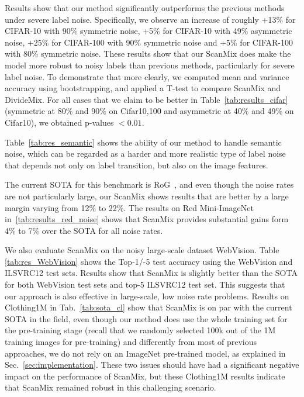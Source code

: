\documentclass[review]{elsarticle}
\theoremstyle{plain}
\begin{document}
Results show that our method significantly outperforms the previous methods under severe label noise. Specifically, we observe an increase of roughly +13\% for CIFAR-10 with 90\% symmetric noise, +5\% for CIFAR-10 with 49\% asymmetric noise, +25\% for CIFAR-100 with 90\% symmetric noise and +5\% for CIFAR-100 with 80\% symmetric noise. These results show that our ScanMix does make the model more robust to noisy labels than previous methods, particularly for severe label noise. To demonstrate that more clearly, we computed mean and variance accuracy using bootstrapping, and applied a T-test to compare ScanMix and DivideMix. For all cases that we claim to be better in Table~\ref{tab:results_cifar} (symmetric at 80\% and 90\% on Cifar10,100 and asymmetric at 40\% and 49\% on Cifar10), we obtained p-values $<0.01$. 

Table~\ref{tab:res_semantic} shows the ability of our method to handle semantic noise, which can be regarded as a harder and more realistic type of label noise that depends not only on label transition, but also on the image features.  

The current SOTA for this benchmark is RoG~\citep{rog}, and even though the noise rates are not particularly large, our ScanMix shows results that are better by a large margin varying from 12\% to 22\%.
The results on Red Mini-ImageNet~\citep{FaMUS} in~\autoref{tab:results_red_noise} shows that ScanMix provides substantial gains form 4\% to 7\% over the SOTA for all noise rates. 

We also evaluate ScanMix on the noisy large-scale dataset WebVision. Table \ref{tab:res_WebVision} shows the Top-1/-5 test accuracy using the WebVision and ILSVRC12 test sets. Results show that ScanMix is slightly better than the SOTA for both WebVision test sets and top-5 ILSVRC12 test set. This suggests that our approach is also effective in large-scale, low noise rate problems.
Results on Clothing1M in Tab.~\ref{tab:sota_cl} show that ScanMix is on par with the current SOTA in the field, even though our method does use the whole training set for the pre-training stage (recall that we randomly selected 100k out of the 1M training images for pre-training) and differently from most of previous approaches, we do not rely on an ImageNet pre-trained model, as explained in Sec.~\ref{sec:implementation}. These two issues should have had a significant negative impact on the performance of ScanMix, but these Clothing1M results indicate that ScanMix remained robust in this challenging scenario. 
\end{document}

